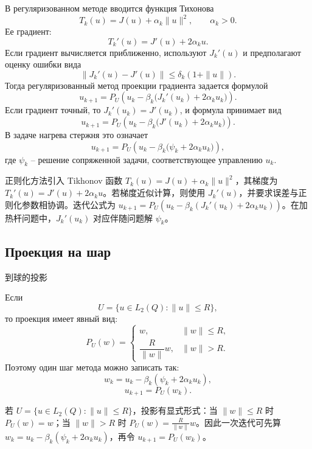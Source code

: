 \documentclass[12pt,a4paper]{article}
\newcommand{\zh}[1]{\par\noindent #1\par}
\begin{document}
В регуляризованном методе вводится функция Тихонова
\[
T_k(u)=J(u)+\alpha_k\|u\|^2,
\qquad \alpha_k>0.
\]
Ее градиент:
\[
T_k'(u)=J'(u)+2\alpha_k u.
\]
Если градиент вычисляется приближенно, используют \(J_k'(u)\) и предполагают оценку ошибки вида
\[
\|J_k'(u)-J'(u)\|\le \delta_k(1+\|u\|).
\]
Тогда регуляризованный метод проекции градиента задается формулой
\[
u_{k+1}=P_U\left(u_k-\beta_k\bigl(J_k'(u_k)+2\alpha_k u_k\bigr)\right).
\]
Если градиент точный, то \(J_k'(u_k)=J'(u_k)\), и формула принимает вид
\[
u_{k+1}=P_U\left(u_k-\beta_k\bigl(J'(u_k)+2\alpha_k u_k\bigr)\right).
\]
В задаче нагрева стержня это означает
\[
u_{k+1}=P_U\left(u_k-\beta_k\bigl(\psi_k+2\alpha_k u_k\bigr)\right),
\]
где \(\psi_k\) -- решение сопряженной задачи, соответствующее управлению \(u_k\).
\zh{正则化方法引入 Tikhonov 函数 \(T_k(u)=J(u)+\alpha_k\|u\|^2\)，其梯度为 \(T_k'(u)=J'(u)+2\alpha_k u\)。若梯度近似计算，则使用 \(J_k'(u)\)，并要求误差与正则化参数相协调。迭代公式为 \(u_{k+1}=P_U(u_k-\beta_k(J_k'(u_k)+2\alpha_k u_k))\)。在加热杆问题中，\(J_k'(u_k)\) 对应伴随问题解 \(\psi_k\)。}

\subsection*{Проекция на шар}
\zh{到球的投影}
Если
\[
U=\{u\in L_2(Q):\|u\|\le R\},
\]
то проекция имеет явный вид:
\[
P_U(w)=
\begin{cases}
w, & \|w\|\le R,\\[2mm]
\dfrac{R}{\|w\|}w, & \|w\|>R.
\end{cases}
\]
Поэтому один шаг метода можно записать так:
\[
w_k=u_k-\beta_k(\psi_k+2\alpha_k u_k),
\]
\[
u_{k+1}=P_U(w_k).
\]
\zh{若 \(U=\{u\in L_2(Q):\|u\|\le R\}\)，投影有显式形式：当 \(\|w\|\le R\) 时 \(P_U(w)=w\)；当 \(\|w\|>R\) 时 \(P_U(w)=\frac{R}{\|w\|}w\)。因此一次迭代可先算 \(w_k=u_k-\beta_k(\psi_k+2\alpha_k u_k)\)，再令 \(u_{k+1}=P_U(w_k)\)。}
\end{document}
